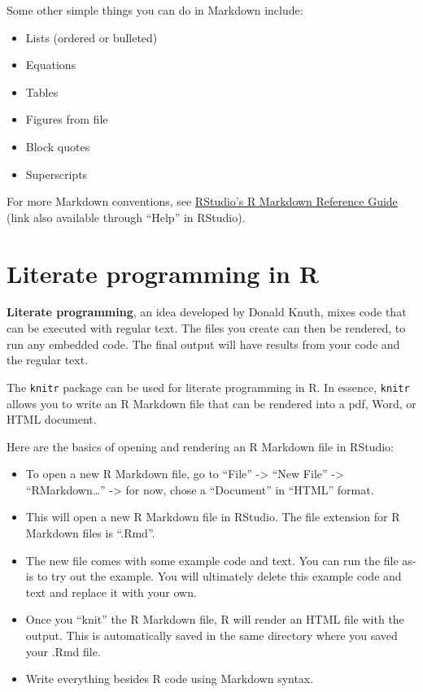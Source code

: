 \documentclass[]{book}
\providecommand{\tightlist}{%
  \setlength{\itemsep}{0pt}\setlength{\parskip}{0pt}}
\begin{document}
Some other simple things you can do in Markdown include:

\begin{itemize}
\tightlist
\item
  Lists (ordered or bulleted)
\item
  Equations
\item
  Tables
\item
  Figures from file
\item
  Block quotes
\item
  Superscripts
\end{itemize}

For more Markdown conventions, see
\href{https://www.rstudio.com/wp-content/uploads/2015/03/rmarkdown-reference.pdf}{RStudio's
R Markdown Reference Guide} (link also available through ``Help'' in
RStudio).

\section{Literate programming in R}\label{literate-programming-in-r}

\textbf{Literate programming}, an idea developed by Donald Knuth, mixes
code that can be executed with regular text. The files you create can
then be rendered, to run any embedded code. The final output will have
results from your code and the regular text.

The \texttt{knitr} package can be used for literate programming in R. In
essence, \texttt{knitr} allows you to write an R Markdown file that can
be rendered into a pdf, Word, or HTML document.

Here are the basics of opening and rendering an R Markdown file in
RStudio:

\begin{itemize}
\tightlist
\item
  To open a new R Markdown file, go to ``File'' -\textgreater{} ``New
  File'' -\textgreater{} ``RMarkdown\ldots{}'' -\textgreater{} for now,
  chose a ``Document'' in ``HTML'' format.
\item
  This will open a new R Markdown file in RStudio. The file extension
  for R Markdown files is ``.Rmd''.
\item
  The new file comes with some example code and text. You can run the
  file as-is to try out the example. You will ultimately delete this
  example code and text and replace it with your own.
\item
  Once you ``knit'' the R Markdown file, R will render an HTML file with
  the output. This is automatically saved in the same directory where
  you saved your .Rmd file.
\item
  Write everything besides R code using Markdown syntax.
\end{itemize}
\end{document}
